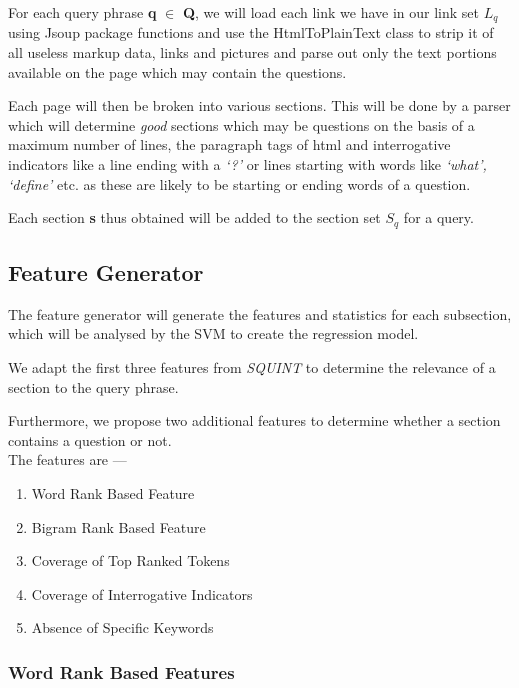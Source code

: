 \documentclass[10pt,a4paper]{report}
\begin{document}
For each query phrase \textbf{q} $\in$ \textbf{Q}, we will load each link we have in our link set \textbf{$L_{q}$} using Jsoup package functions and use the HtmlToPlainText class to strip it of all useless markup data, links and pictures and parse out only the text portions available on the page which may contain the questions. 

Each page will then be broken into various sections. This will be done by a parser which will determine \textit{good} sections which may be questions on the basis of a maximum number of lines, the paragraph tags of html and interrogative indicators like a line ending with a \textit{`?'} or lines starting with words like \textit{`what', `define'} etc. as these are likely to be starting or ending words of a question.

Each section \textbf{s} thus obtained will be added to the section set \textbf{$S_{q}$} for a query.

\subsection{Feature Generator}

The feature generator will generate the features and statistics for each subsection, which will be analysed by the SVM to create the regression model. 

We adapt the first three features from \textit{SQUINT} to determine the relevance of a section to the query phrase\cite{squint}. 

Furthermore, we propose two additional features to determine whether a section contains a question or not. \\

The features are ---

\begin{enumerate}
	\item Word Rank Based Feature
	\item Bigram Rank Based Feature
	\item Coverage of Top Ranked Tokens
	\item Coverage of Interrogative Indicators
	\item Absence of Specific Keywords
\end{enumerate}


\subsubsection {Word Rank Based Features}
\end{document}
